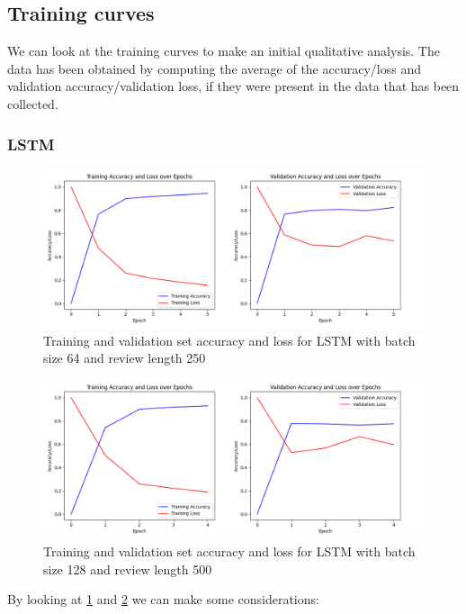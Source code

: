 \documentclass{article}
\begin{document}
\subsection{Training curves}

We can look at the training curves to make an initial qualitative analysis.
The data has been obtained by computing the average of the accuracy/loss and validation accuracy/validation loss, if they were present in the data that has been collected.

\subsubsection{LSTM}

\begin{figure}[H]
  \centering
  \includegraphics[width=0.9\linewidth]{img/training_curves_lstm_64_250.png}
  \caption{Training and validation set accuracy and loss for LSTM with batch size 64 and review length 250}
  \label{fig:training_curves_lstm_64_250}
\end{figure}

\begin{figure}[H]
  \centering
  \includegraphics[width=0.9\linewidth]{img/training_curves_lstm_128_500.png}
  \caption{Training and validation set accuracy and loss for LSTM with batch size 128 and review length 500}
  \label{fig:training_curves_lstm_128_500}
\end{figure}

By looking at \ref{fig:training_curves_lstm_64_250} and \ref{fig:training_curves_lstm_128_500} we can make some considerations:
\end{document}
